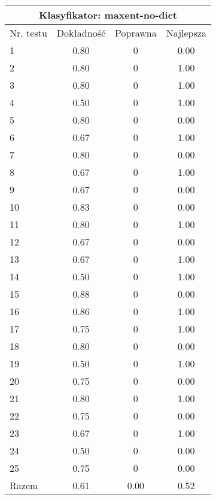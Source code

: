 \begin{tabular}{|l|c|c|c|}
\hline
\multicolumn{4}{|c|}{Klasyfikator: maxent-no-dict}\\
\hline
Nr. testu & Dokładność & Poprawna & Najlepsza\\
\hline
1 & 0.80 & 0 & 0.00 \\
2 & 0.80 & 0 & 1.00 \\
3 & 0.80 & 0 & 1.00 \\
4 & 0.50 & 0 & 1.00 \\
5 & 0.80 & 0 & 0.00 \\
6 & 0.67 & 0 & 1.00 \\
7 & 0.80 & 0 & 0.00 \\
8 & 0.67 & 0 & 1.00 \\
9 & 0.67 & 0 & 0.00 \\
10 & 0.83 & 0 & 0.00 \\
11 & 0.80 & 0 & 1.00 \\
12 & 0.67 & 0 & 0.00 \\
13 & 0.67 & 0 & 1.00 \\
14 & 0.50 & 0 & 1.00 \\
15 & 0.88 & 0 & 0.00 \\
16 & 0.86 & 0 & 1.00 \\
17 & 0.75 & 0 & 1.00 \\
18 & 0.80 & 0 & 0.00 \\
19 & 0.50 & 0 & 1.00 \\
20 & 0.75 & 0 & 0.00 \\
21 & 0.80 & 0 & 1.00 \\
22 & 0.75 & 0 & 0.00 \\
23 & 0.67 & 0 & 1.00 \\
24 & 0.50 & 0 & 0.00 \\
25 & 0.75 & 0 & 0.00 \\
\hline
Razem & 0.61 & 0.00 & 0.52 \\
\hline
\end{tabular}
